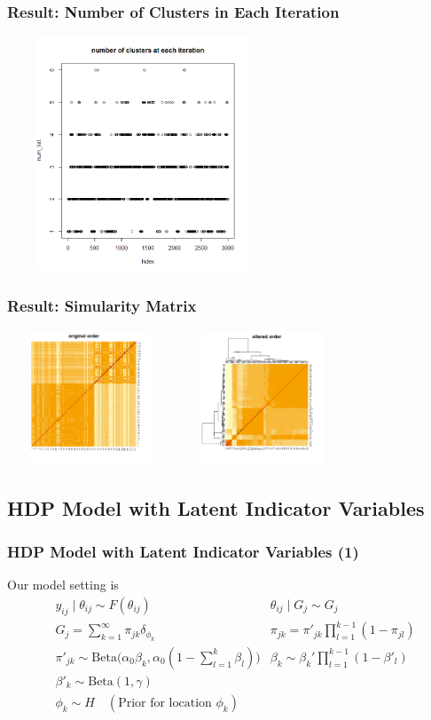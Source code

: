 \documentclass{beamer}
\begin{document}
	\begin{frame}
		\frametitle{Result: Number of Clusters in Each Iteration}
		\includegraphics[width=8cm,height=7cm]{pic/image8.png}
	\end{frame}
	\begin{frame}
		\frametitle{Result: Simularity Matrix}
		\includegraphics[width=5cm,height=4cm]{pic/image9.png}
		\includegraphics[width=5cm,height=4cm]{pic/image10.png}
	\end{frame}

\subsection{\small{HDP Model with Latent Indicator Variables}}
\begin{frame}
		\frametitle{HDP Model with Latent Indicator Variables (1)}
Our model setting is
\begin{align*}
&y_{ij} \mid \theta_{ij} \sim F(\theta_{ij})
&\theta_{ij} \mid G_j \sim G_j\\
&G_j = \sum_{k = 1}^\infty \pi_{jk}\delta_{\phi_k}
&\pi_{jk} = \pi'_{jk}\prod_{l = 1}^{k-1}(1 - \pi_{jl})\\
&\pi'_{jk} \sim \mathrm{Beta}\biggl(\alpha_0\beta_k, \alpha_0 (1 - \sum_{l=1}^k\beta_l)\biggr)
&\beta_k \sim \beta_k' \prod_{l = 1}^{k-1}(1-\beta'_l)\\
&\beta'_k \sim \mathrm{Beta}(1, \gamma)\\
&\phi_k \sim H \quad (\text{Prior for location } \phi_k)
\end{align*}
\end{frame}
\end{document}
